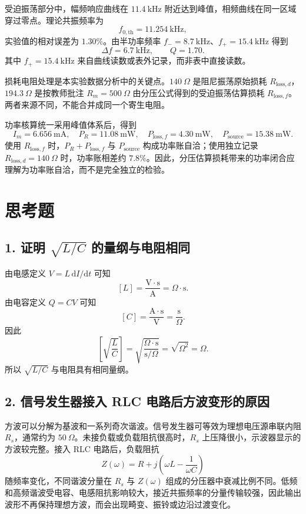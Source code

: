 ﻿\documentclass[UTF8,12pt,a4paper]{ctexart}
\numberwithin{equation}{section}
\begin{document}
受迫振荡部分中，幅频响应曲线在 \(11.4\ \mathrm{kHz}\) 附近达到峰值，相频曲线在同一区域穿过零点。理论共振频率为
\[
    f_{0,\mathrm{th}}=11.254\ \mathrm{kHz},
\]
实验值的相对误差为 \(1.30\%\)。由半功率频率 \(f_-=8.7\ \mathrm{kHz}\)、\(f_+=15.4\ \mathrm{kHz}\) 得到
\[
    \Delta f=6.7\ \mathrm{kHz},\qquad Q=1.70.
\]
其中 \(f_+=15.4\ \mathrm{kHz}\) 来自曲线读数或表外记录，而非表中直接读数。

损耗电阻处理是本实验数据分析中的关键点。\(140\ \Omega\) 是阻尼振荡原始损耗 \(R_{\mathrm{loss},d}\)，\(194.3\ \Omega\) 是按教师批注 \(R_m=500\ \Omega\) 由分压公式得到的受迫振荡估算损耗 \(R_{\mathrm{loss},f}\)。两者来源不同，不能合并成同一个寄生电阻。

功率核算统一采用峰值体系后，得到
\[
    I_m=6.656\ \mathrm{mA},\quad
    P_R=11.08\ \mathrm{mW},\quad
    P_{\mathrm{loss},f}=4.30\ \mathrm{mW},\quad
    P_{\mathrm{source}}=15.38\ \mathrm{mW}.
\]
使用 \(R_{\mathrm{loss},f}\) 时，\(P_R+P_{\mathrm{loss},f}\) 与 \(P_{\mathrm{source}}\) 构成功率账自洽；使用独立记录 \(R_{\mathrm{loss},d}=140\ \Omega\) 时，功率账相差约 \(7.8\%\)。因此，分压估算损耗带来的功率闭合应理解为功率账自洽，而不是完全独立的检验。

\section{思考题}

\subsection*{1. 证明 \(\sqrt{L/C}\) 的量纲与电阻相同}

由电感定义 \(V=L\,\mathrm{d}I/\mathrm{d}t\) 可知
\[
    [L]=\frac{\mathrm{V}\cdot\mathrm{s}}{\mathrm{A}}=\Omega\cdot\mathrm{s}.
\]
由电容定义 \(Q=CV\) 可知
\[
    [C]=\frac{\mathrm{A}\cdot\mathrm{s}}{\mathrm{V}}=\frac{\mathrm{s}}{\Omega}.
\]
因此
\[
    \left[\sqrt{\frac{L}{C}}\right]
    =\sqrt{\frac{\Omega\cdot\mathrm{s}}{\mathrm{s}/\Omega}}
    =\sqrt{\Omega^2}
    =\Omega.
\]
所以 \(\sqrt{L/C}\) 与电阻具有相同量纲。

\subsection*{2. 信号发生器接入 RLC 电路后方波变形的原因}

方波可以分解为基波和一系列奇次谐波。信号发生器可等效为理想电压源串联内阻 \(R_s\)，通常约为 \(50\ \Omega\)。未接负载或负载阻抗很高时，\(R_s\) 上压降很小，示波器显示的方波较完整。接入 RLC 电路后，负载阻抗
\[
    Z(\omega)=R+j\left(\omega L-\frac{1}{\omega C}\right)
\]
随频率变化，不同谐波分量在 \(R_s\) 与 \(Z(\omega)\) 组成的分压器中衰减比例不同。低频和高频谐波受电容、电感阻抗影响较大，接近共振频率的分量传输较强，因此输出波形不再保持理想方波，而会出现畸变、振铃或边沿过渡变化。
\end{document}
